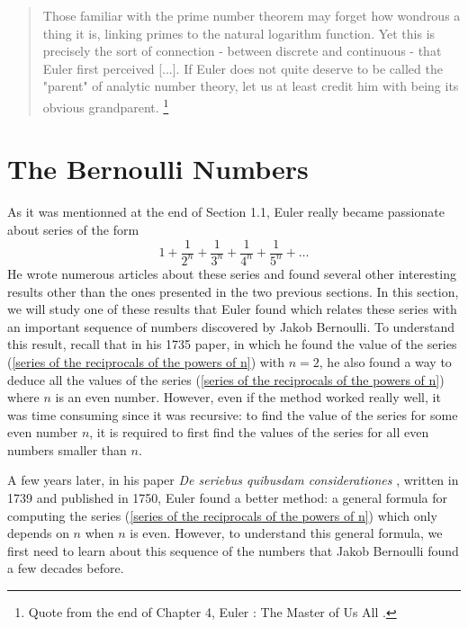 \begin{quotation}
    Those familiar with the prime number theorem may forget how wondrous a thing it is, linking primes to the natural logarithm function. Yet this is precisely the sort of connection - between discrete and continuous - that Euler first perceived [...]. If Euler does not quite deserve to be called the "parent" of analytic number theory, let us at least credit him with being its obvious grandparent. \footnote{Quote from the end of Chapter 4, Euler : The Master of Us All \cite{dunham1999euler}. }
\end{quotation}

\section{The Bernoulli Numbers}

As it was mentionned at the end of Section 1.1, Euler really became passionate about series of the form
\begin{equation}\label{series of the reciprocals of the powers of n}
    1 + \frac{1}{2^n} + \frac{1}{3^n} + \frac{1}{4^n} + \frac{1}{5^n} + \dots
\end{equation}
He wrote numerous articles about these series and found several other interesting results other than the ones presented in the two previous sections. In this section, we will study one of these results that Euler found which relates these series with an important sequence of numbers discovered by Jakob Bernoulli. To understand this result, recall that in his 1735 paper, in which he found the value of the series (\ref{series of the reciprocals of the powers of n}) with $n = 2$, he also found a way to deduce all the values of the series (\ref{series of the reciprocals of the powers of n}) where $n$ is an even number. However, even if the method worked really well, it was time consuming since it was recursive: to find the value of the series for some even number $n$, it is required to first find the values of the series for all even numbers smaller than $n$.

A few years later, in his paper \textit{De seriebus quibusdam considerationes} \cite{euler1750seriebus}, written in 1739 and published in 1750, Euler found a better method: a general formula for computing the series (\ref{series of the reciprocals of the powers of n}) which only depends on $n$ when $n$ is even. However, to understand this general formula, we first need to learn about this sequence of the numbers that Jakob Bernoulli found a few decades before.

